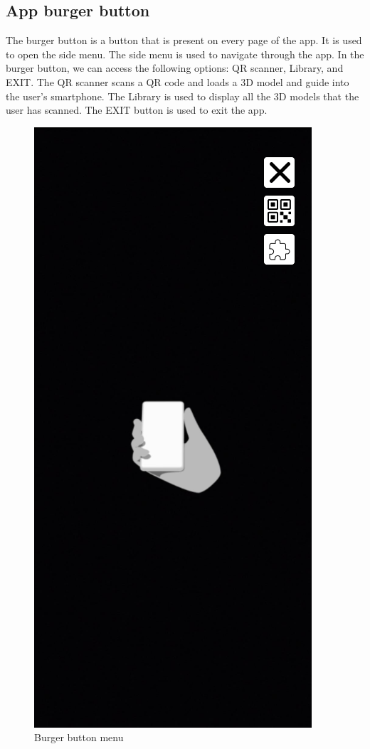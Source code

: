 \subsection{App burger button}
The burger button is a button that is present on every page of the app. It is used to open the side menu. The side menu is used to navigate through the app. In the burger button, we can access the following options: QR scanner, Library, and EXIT.
The QR scanner scans a QR code and loads a 3D model and guide into the user's smartphone. The Library is used to display all the 3D models that the user has scanned. The EXIT button is used to exit the app.
\begin{figure}[h!]
    \begin{center}
        \includegraphics[scale=0.5]{img/App_mock/iPhone 14 - 2.png}
        \caption{Burger button menu}
        \label{fig:burger-button}
    \end{center}
\end{figure}
\pagebreak

